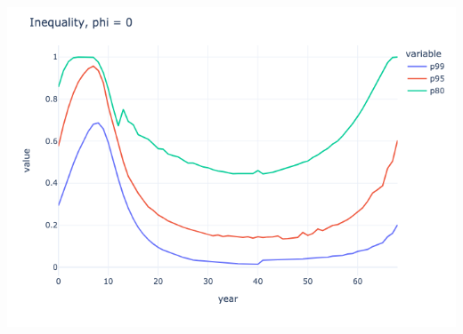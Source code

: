 \begin{questions}
\begin{solution}
	\includegraphics[scale=0.5]{figures/inequality_0_tax_30.png}
\end{solution}



\end{questions}


